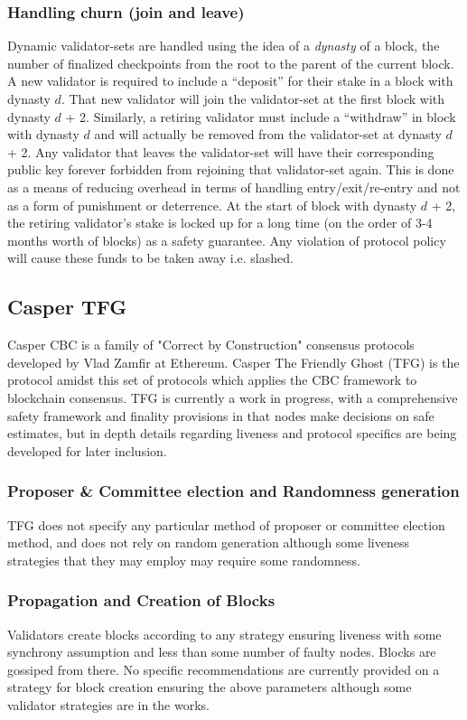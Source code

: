 \documentclass[10pt,journal,compsoc]{IEEEtran}
\begin{document}
\subsubsection{Handling churn (join and leave)}
Dynamic validator-sets are handled using the idea of a \emph{dynasty} of a block, the number of finalized checkpoints from the root to the parent of the current block. A new validator is required to include a “deposit” for their stake in a block with dynasty $d$. That new validator will join the validator-set at the first block with dynasty $d$ + 2. Similarly, a retiring validator must include a “withdraw” in block with dynasty $d$ and will actually be removed from the validator-set at dynasty $d$ + 2. Any validator that leaves the validator-set will have their corresponding public key forever forbidden from rejoining that validator-set again. This is done as a means of reducing overhead in terms of handling entry/exit/re-entry and not as a form of punishment or deterrence. At the start of block with dynasty $d$ + 2, the retiring validator's stake is locked up for a long time (on the order of 3-4 months worth of blocks) as a safety guarantee. Any violation of protocol policy will cause these funds to be taken away i.e. slashed.

\subsection{Casper TFG}
Casper CBC is a family of "Correct by Construction" consensus protocols developed by Vlad Zamfir at Ethereum. Casper The Friendly Ghost (TFG) \cite{TFG} is the protocol amidst this set of protocols which applies the CBC framework to blockchain consensus. TFG is currently a work in progress, with a comprehensive safety framework and finality provisions in that nodes make decisions on safe estimates, but in depth details regarding liveness and protocol specifics are being developed for later inclusion. 

\subsubsection{Proposer \& Committee election and Randomness generation}
TFG does not specify any particular method of proposer or committee election method, and does not rely on random generation although some liveness strategies that they may employ may require some randomness. 

\subsubsection{Propagation and Creation of Blocks}
Validators create blocks according to any strategy ensuring liveness with some synchrony assumption and less than some number of faulty nodes. Blocks are gossiped from there. No specific recommendations are currently provided on a strategy for block creation ensuring the above parameters although some validator strategies are in the works.
\end{document}
